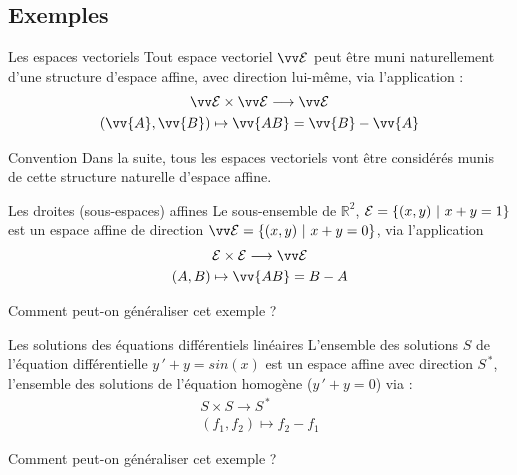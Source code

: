 \documentclass[bigger]{m53beamer}
\begin{document}
\subsection{Exemples}
  \begin{frame}{Les espaces vectoriels}
    Tout espace vectoriel $\ev{E}$ peut être muni naturellement d'une structure d'espace affine, avec direction lui-même, via l'application :
    \begin{gather*}
      \ev{E} \times \ev{E} \longrightarrow \ev{E}\\
      (\vv{A},\vv{B}) \mapsto \vv{AB}=\vv{B}-\vv{A}
    \end{gather*}\pause
    \begin{block}{Convention}
      Dans la suite, tous les espaces vectoriels vont être considérés munis de cette structure naturelle d'espace affine.
    \end{block}
  \end{frame}
  \begin{frame}{Les droites (sous-espaces) affines}
    Le sous-ensemble de $\mathbb{R}^{2}$, $\mathcal{E}=\{(x,y)\ |\ x+y=1 \}$ est un espace affine de direction $\ev{E}=\{(x,y)\ |\ x+y=0 \}$, via l'application
    \begin{gather*}
      \ens{E} \times \ens{E} \longrightarrow \ev{E}\\
      (A,B) \mapsto \vv{AB}=B-A
    \end{gather*}\pause
    \begin{question}
      Comment peut-on généraliser cet exemple ?
    \end{question}
  \end{frame}
  \begin{frame}{Les solutions des équations différentiels linéaires}
    L'ensemble des solutions $S$ de l'équation différentielle $y\,'+y=sin(x)$ est un espace affine avec direction $S^{\,\ast}$, l'ensemble des solutions de l'équation homogène ($y\,'+y=0$) via :
    \begin{gather*}
      S \times S \longrightarrow S^{\,\ast}\\
      (f_{1},f_{2}) \mapsto f_{2}-f_{1}
    \end{gather*}\pause
    \begin{question}
      Comment peut-on généraliser cet exemple ?
    \end{question}
  \end{frame}
\end{document}
